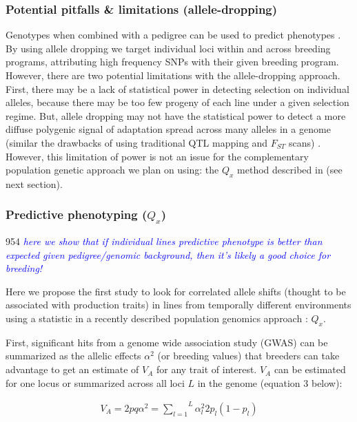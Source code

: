 \documentclass[12pt]{article}
\newcommand{\jri}[1]{\textcolor{blue}{ \emph{\scriptsize  #1}} }
\begin{document}
{\subsubsection*{Potential pitfalls \& limitations (allele-dropping)}
Genotypes when combined with a pedigree can be used to predict phenotypes \citep{de2009predicting,crossa2010prediction,Decker:2012kd}.
By using allele dropping we target individual loci within and across breeding programs, attributing high frequency SNPs with their given breeding program. 
However, there are two potential limitations with the allele-dropping approach. First, there may be a lack of statistical power in detecting selection on individual alleles, because there may be too few progeny of each line under a given selection regime. 
But, allele dropping may not have the statistical power to detect a more diffuse polygenic signal of adaptation spread across many alleles in a genome (similar the drawbacks of using traditional QTL mapping and $F_{ST}$ scans) \cite{Rockman:2011ej, Berg:2014bs}. 
However, this limitation of power is not an issue for the complementary population genetic approach we plan on using: the $Q_{x}$ method described in \cite{Berg:2014bs} (see next section). 

\subsubsection*{Predictive phenotyping ($Q_{x}$)}954
\jri{here we show that if individual lines predictive phenotype is better than expected given pedigree/genomic background, then it's likely a good choice for breeding! }

Here we propose the first study to look for correlated allele shifts (thought to be associated with production traits) in lines from temporally different environments using a statistic in a recently described population genomics approach \cite{Berg:2014bs}: $Q_{x}$. 

First, significant hits from a genome wide association study (GWAS)  can be summarized as the allelic effects $\alpha^{2}$ (or breeding values) that breeders can take advantage to get an estimate of $V_{A}$ for any trait of interest. $V_{A}$ can be estimated for one locus or summarized across all loci $L$ in the genome (equation 3 below):

  \begin{align}
    V_A = 2pq\alpha^2
     = \overset{L}{\underset{l=1}{\sum}}\alpha^2_l2p_l(1-p_l)
  \end{align}

}
\end{document}

